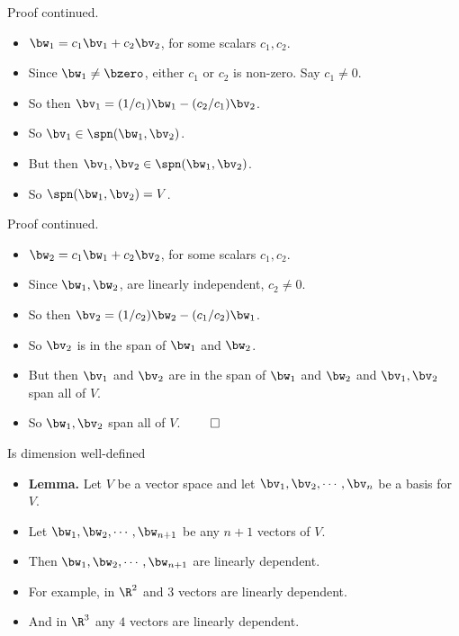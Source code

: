 \documentclass{beamer}
\begin{document}
\begin{frame}{Proof continued.}

\begin{itemize}
\item $\bw_1 = c_1\bv_1 + c_2\bv_2$, for some scalars $c_1, c_2$.
\item Since $\bw_1\not=\bzero$, either $c_1$ or $c_2$ is non-zero. Say $c_1 \not= 0$.
\item So then $\bv_1 = (1/c_1)\bw_1 - (c_2/c_1)\bv_2$.
\item So $\bv_1\in\spn(\bw_1,\bv_2)$.
\item But then $\bv_1,\bv_2\in\spn(\bw_1,\bv_2)$.
\item So $\spn(\bw_1,\bv_2)=V$.
\end{itemize}

\end{frame}

\begin{frame}{Proof continued.}

\begin{itemize}
\item $\bw_2 = c_1\bw_1 + c_2\bv_2$, for some scalars $c_1, c_2$.
\item Since $\bw_1, \bw_2$, are linearly independent, $c_2 \not= 0$.
\item So then $\bv_2 = (1/c_2)\bw_2 - (c_1/c_2)\bw_1$.
\item So $\bv_2$ is in the span of $\bw_1$ and $\bw_2$.
\item But then $\bv_1$ and $\bv_2$ are in the span of $\bw_1$ and $\bw_2$
and $\bv_1,\bv_2$ span all of $V$.
\item So $\bw_1,\bv_2$ span all of $V$. $\qed$
\end{itemize}

\end{frame}
\begin{frame}{Is dimension well-defined}

\begin{itemize}
\item \textbf{Lemma.} Let $V$ be a vector space and let $\bv_1,\bv_2,\cdots,\bv_n$ be a basis for $V$.
\item Let $\bw_1,\bw_2,\cdots,\bw_{n+1}$  be any $n+1$ vectors of $V$.
\item Then $\bw_1,\bw_2,\cdots,\bw_{n+1}$ are linearly dependent.
\item For example, in $\R^2$ and $3$ vectors are linearly dependent.
\item And in $\R^3$ any $4$ vectors are linearly dependent.
\end{itemize}

\end{frame}
\end{document}
